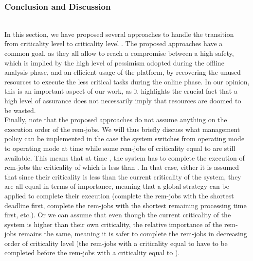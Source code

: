 \documentclass[10pt, conference, compsocconf, final]{IEEEtran}
\theoremstyle{definition}
\begin{document}
{\subsubsection{Conclusion and Discussion}~\\
In this section, we have proposed several approaches to handle the transition from criticality level  to criticality level . The proposed approaches have a common goal, as they all allow to reach a compromise between a high safety, which is implied by the high level of pessimism adopted during the offline analysis phase, and an efficient usage of the platform, by recovering the unused resources to execute the less critical tasks during the online phase. In our opinion, this is an important aspect of our work, as it highlights the crucial fact that a high level of assurance does not necessarily imply that resources are doomed to be wasted.\\
Finally, note that the proposed approaches do not assume anything on the execution order of the rem-jobs. We will thus briefly discuss what management policy can be implemented in the case the system switches from operating mode  to operating mode  at time  while some rem-jobs of criticality equal to  are still available. This means that at time , the system has to complete the execution of rem-jobs the criticality of which is less than . In that case, either it is assumed that since their criticality is less than the current criticality of the system, they are all equal in terms of importance, meaning that a global strategy can be applied to complete their execution (complete the rem-jobs with the shortest deadline first, complete the rem-jobs with the shortest remaining processing time first, etc.). Or we can assume that even though the current criticality of the system is higher than their own criticality, the relative importance of the rem-jobs remains the same, meaning it is safer to complete the rem-jobs in decreasing order of criticality level (the rem-jobs with a criticality equal to  have to be completed before the rem-jobs with a criticality equal to ).

}
\end{document}
